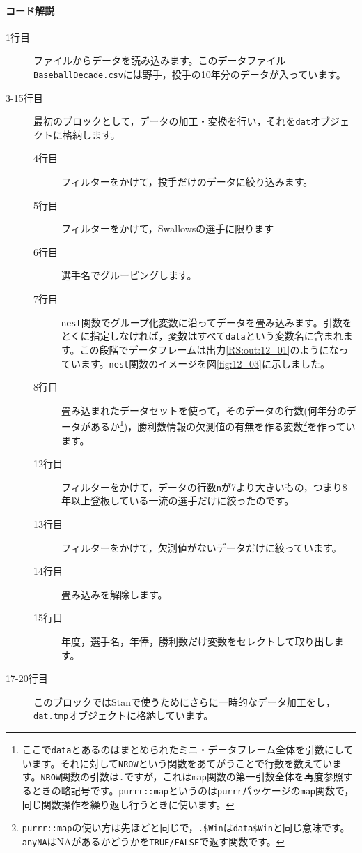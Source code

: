 \documentclass{ltjsbook}
\begin{document}
\paragraph{コード解説}
\begin{description}
	\item[1行目] ファイルからデータを読み込みます。このデータファイル\verb|BaseballDecade.csv|には野手，投手の10年分のデータが入っています。
	\item[3-15行目] 最初のブロックとして，データの加工・変換を行い，それを\verb|dat|オブジェクトに格納します。
	      \begin{description}
		      \item[4行目] フィルターをかけて，投手だけのデータに絞り込みます。
		      \item[5行目] フィルターをかけて，Swallowsの選手に限ります
		      \item[6行目] 選手名でグルーピングします。
		      \item[7行目] \verb|nest|関数でグループ化変数に沿ってデータを畳み込みます。引数をとくに指定しなければ，変数はすべて\verb|data|という変数名に含まれます。この段階でデータフレームは出力\ref{RS:out:12_01}のようになっています。\verb|nest|関数のイメージを図\ref{fig:12_03}に示しました。
		      \item[8行目] 畳み込まれたデータセットを使って，そのデータの行数(何年分のデータがあるか\footnote{ここで\verb|data|とあるのはまとめられたミニ・データフレーム全体を引数にしています。それに対して\verb|NROW|という関数をあてがうことで行数を数えています。\verb|NROW|関数の引数は\verb|.|ですが，これは\verb|map|関数の第一引数全体を再度参照するときの略記号です。\verb|purrr::map|というのは\verb|purrr|パッケージの\verb|map|関数で，同じ関数操作を繰り返し行うときに使います。})，勝利数情報の欠測値の有無を作る変数\footnote{\verb|purrr::map|の使い方は先ほどと同じで，\verb|.$Win|は\verb|data$Win|と同じ意味です。\verb|anyNA|はNAがあるかどうかを\verb|TRUE/FALSE|で返す関数です。}を作っています。
		      \item[12行目] フィルターをかけて，データの行数\verb|n|が7より大きいもの，つまり8年以上登板している一流の選手だけに絞ったのです。
		      \item[13行目] フィルターをかけて，欠測値がないデータだけに絞っています。
		      \item[14行目] 畳み込みを解除します。
		      \item[15行目] 年度，選手名，年俸，勝利数だけ変数をセレクトして取り出します。
	      \end{description}
	\item[17-20行目] このブロックではStanで使うためにさらに一時的なデータ加工をし，\verb|dat.tmp|オブジェクトに格納しています。

\end{description}
\end{document}
